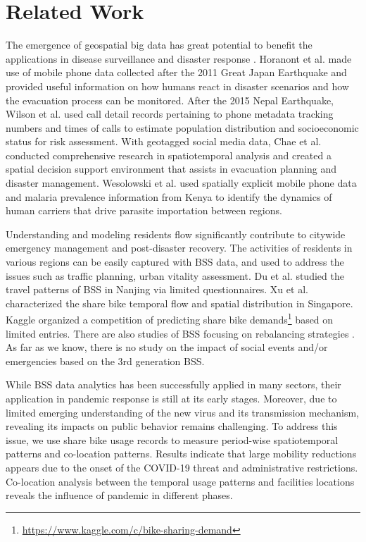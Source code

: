 \documentclass[preprints,article,accept,moreauthors,pdftex]{Definitions/mdpi}
\begin{document}
\section*{Related Work}
The emergence of geospatial big data has great potential to benefit the applications in disease surveillance and disaster response \cite{Yu2018Big, Goodchild2010Crowdsourcing, Huang2015Predicating}.
Horanont et al. \cite{Horanont2013Auto} made use of mobile phone data collected after the 2011 Great Japan Earthquake and provided useful information on how humans react in disaster scenarios and how the evacuation process can be monitored.
After the 2015 Nepal Earthquake, Wilson et al. \cite{Wilson2016Rapid} used call detail records pertaining to phone metadata tracking numbers and times of calls to estimate population distribution and socioeconomic status for risk assessment.
With geotagged social media data, Chae et al. \cite{CHAE2013Public} conducted comprehensive research in spatiotemporal analysis and created a spatial decision support environment that assists in evacuation planning and disaster management.
Wesolowski et al. \cite{Wesolowski2012Quantifying} used spatially explicit mobile phone data and malaria prevalence information from Kenya to identify the dynamics of human carriers that drive parasite importation between regions.

Understanding and modeling residents flow significantly contribute to citywide emergency management and post-disaster recovery.
The activities of residents in various regions can be easily captured with BSS data, and used to address the issues such as traffic planning, urban vitality assessment.
Du et al. \cite{du2018better} studied the travel patterns of BSS in Nanjing via limited questionnaires.
Xu et al. \cite{xu2019unravel} characterized the share bike temporal flow and spatial distribution in Singapore.
Kaggle organized a competition of predicting share bike demands\footnote{\url{https://www.kaggle.com/c/bike-sharing-demand}} based on limited entries.
There are also studies of BSS focusing on rebalancing strategies \cite{pal2017free, ai2019deep,chen2016dynamic}.
As far as we know, there is no study on the impact of social events and/or emergencies based on the 3rd generation BSS.

While BSS data analytics has been successfully applied in many sectors, their application in pandemic response is still at its early stages.
Moreover, due to limited emerging understanding of the new virus and its transmission mechanism, revealing its impacts on public behavior remains challenging.
To address this issue, we use share bike usage records to measure period-wise spatiotemporal patterns and co-location patterns. 
Results indicate that large mobility reductions appears due to the onset of the COVID-19 threat and administrative restrictions.
Co-location analysis between the temporal usage patterns and facilities locations reveals the influence of pandemic in different phases.
\end{document}
